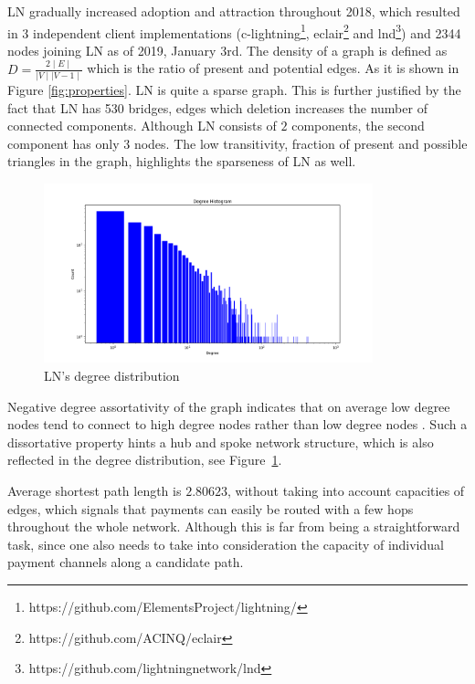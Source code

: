 \documentclass[a4paper]{article}
\theoremstyle{definition}
\begin{document}
LN gradually increased adoption and attraction throughout 2018, which resulted in 3 independent client implementations (c-lightning\footnote{https://github.com/ElementsProject/lightning/}, eclair\footnote{https://github.com/ACINQ/eclair} and lnd\footnote{https://github.com/lightningnetwork/lnd}) and \num[group-separator={,}]{2344} nodes joining LN as of 2019, January 3rd. The density of a graph is defined as $D=\frac{2\mid E\mid}{\mid V\mid \mid V-1\mid}$  which is the ratio of present and potential edges. As it is shown in Figure \ref{fig:properties}. LN is quite a sparse graph. This is further justified by the fact that LN has \num[group-separator={,}]{530} bridges, edges which deletion increases the number of connected components. Although LN consists of $2$ components, the second component has only $3$ nodes. The low transitivity, fraction of present and possible triangles in the graph, highlights the sparseness of LN as well.

\begin{figure}
	\caption{LN's degree distribution}\label{fig:degreedist}
	\begin{center}
		\includegraphics[width=0.85\textwidth]{degreehistogramloglogscale.png}
	\end{center}	
\end{figure}

Negative degree assortativity of the graph indicates that on average low degree nodes tend to connect to high degree nodes rather than low degree nodes \cite{newman2002assortative}. Such a dissortative property hints a hub and spoke network structure, which is also reflected in the degree distribution, see Figure~\ref{fig:degreedist}.

Average shortest path length is $2.80623$, without taking into account capacities of edges, which signals that payments can easily be routed with a few hops throughout the whole network. Although this is far from being a straightforward task, since one also needs to take into consideration the capacity of individual payment channels along a candidate path.
\end{document}
